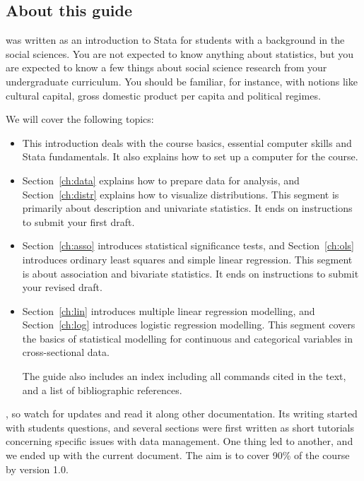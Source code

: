 \subsection{About this guide}%
	 was written as an introduction to Stata for students with a background in the social sciences. You are not expected to know anything about statistics, but you are expected to know a few things about social science research from your undergraduate curriculum. You should be familiar, for instance, with notions like cultural capital, gross domestic product per capita and political regimes.%

	We will cover the following topics:%

	\begin{itemize}
		\item This introduction deals with the course basics, essential computer skills and Stata fundamentals. It also explains how to set up a computer for the course.%
	
		\item %
		Section~\ref{ch:data} explains how to prepare data for analysis, and %
		Section~\ref{ch:distr} explains how to visualize distributions. This segment is primarily about description and univariate statistics. %
    It ends on instructions to submit your first draft.
	
		\item %
		Section~\ref{ch:asso} introduces statistical significance tests, and %
		Section~\ref{ch:ols} introduces ordinary least squares and simple linear regression. This segment is about association and bivariate statistics. %
    It ends on instructions to submit your revised draft.

		\item %
		Section~\ref{ch:lin} introduces multiple linear regression modelling, and %
		Section~\ref{ch:log} introduces logistic regression modelling. This segment covers the basics of statistical modelling for continuous and categorical variables in cross-sectional data. %

    The guide also includes an index including all commands cited in the text, and a list of bibliographic references.%
	\end{itemize}

, so watch for updates and read it along other documentation. Its writing started with students questions, and several sections were first written as short tutorials concerning specific issues with data management. One thing led to another, and we ended up with the current document. The aim is to cover 90\% of the course by version 1.0.%

